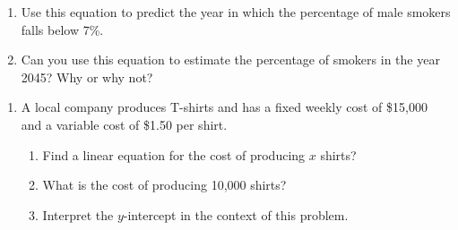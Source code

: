 \documentclass[12pt, twoside]{report}
\begin{document}
\begin{enumerate}
\begin{enumerate}
			\item Use this equation to predict the year in which the percentage of male smokers \\
			falls below 7\%.
			\vfill


			\item Can you use this equation to estimate the percentage of smokers in the year 2045? Why or why not? 
			\vfill

		\end{enumerate}

\end{enumerate}
  
  
  
  
  
\pagebreak




\begin{enumerate}[resume]

	\item  A local company produces T-shirts and has a fixed weekly cost of \$15,000 and a variable cost of \$1.50 per shirt.  	
	\begin{enumerate}
		\item Find a linear equation for the cost of producing $x$ shirts? 
		\vfill


		\item What is the cost of producing 10,000 shirts?
		\vfill

		
		\item Interpret the $y$-intercept in the context of this problem.
		\vfill 
	\end{enumerate}
	


	
	
\end{enumerate}
\end{document}
